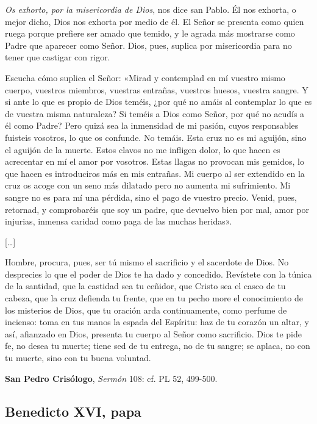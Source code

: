 \begin{patercite}
	\textit{Os exhorto, por la misericordia de Dios}, nos dice san Pablo. Él nos	exhorta, o mejor dicho, Dios nos exhorta por medio de él. El Señor se	presenta como quien ruega porque prefiere ser amado que temido, y le agrada más mostrarse como Padre que aparecer como Señor. Dios, pues, 	suplica por misericordia para no tener que castigar con rigor.
	
	Escucha cómo suplica el Señor: «Mirad y contemplad en mí vuestro mismo cuerpo, vuestros miembros, vuestras entrañas, vuestros huesos, vuestra sangre. Y si ante lo que es propio de Dios teméis, ¿por qué no amáis al contemplar lo que es de vuestra misma naturaleza? Si teméis a Dios como Señor, por qué no acudís a él como Padre? Pero quizá sea la inmensidad de mi pasión, cuyos responsables fuisteis vosotros, lo que os confunde. No temáis. Esta cruz no es mi aguijón, sino el aguijón de la muerte. Estos clavos no me infligen dolor, lo que hacen es acrecentar en mí el amor por vosotros. Estas llagas no provocan mis gemidos, lo que hacen es introduciros más en mis entrañas. Mi cuerpo al ser extendido en la cruz os acoge con un seno más dilatado pero no aumenta mi sufrimiento. Mi sangre no es para mí una pérdida, sino el pago de vuestro precio. Venid, pues, retornad, y comprobaréis que soy un padre, que devuelvo bien por mal, amor por injurias, inmensa caridad como paga de las muchas heridas».
	
	[\ldots]
	
	Hombre, procura, pues, ser tú mismo el sacrificio y el sacerdote de Dios. No desprecies lo que el poder de Dios te ha dado y concedido. Revístete con la túnica de la santidad, que la castidad sea tu ceñidor, que Cristo sea el casco de tu cabeza, que la cruz defienda tu frente, que en tu pecho more el conocimiento de los misterios de Dios, que tu oración arda continuamente, como perfume de incienso: toma en tus manos la espada del Espíritu: haz de tu corazón un altar, y así, afianzado en Dios, presenta tu cuerpo al Señor como sacrificio. Dios te pide fe, no desea tu muerte; tiene sed de tu entrega, no de tu sangre; se aplaca, no con tu muerte, sino con tu buena voluntad.
	
	\textbf{San Pedro Crisólogo}, \textit{Sermón} 108: cf. PL 52, 499-500.
\end{patercite}


\newpage

\subsection{Benedicto XVI, papa}

